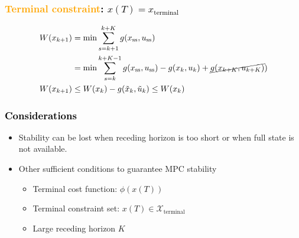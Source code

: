 \subsubsection*{\textcolor{orange}{Terminal constraint}\textcolor{black}{: $x(T) = x_{\text{terminal}}$}}
\begin{minipage}{0.58\textwidth}
    \begin{align*}
        W(x_{k+1}) &= \min \sum_{s=k+1}^{k+K} g(x_\mathrm{ss}, u_\mathrm{ss}) \\
        &= \min \sum_{s=k}^{k+K-1} g(x_\mathrm{ss}, u_\mathrm{ss}) - g(x_k, u_k) + \cancel{g(x_{k+K}, u_{k+K})})\\
        W(x_{k+1}) &\leq W(x_k) - g(\tilde{x}_k, \tilde{u}_k) \leq W(x_k)
    \end{align*}

    \subsubsection*{\textcolor{black}{Considerations}}
    \begin{itemize}
        \item Stability can be lost when receding horizon is too short or when full state is not available.
        \item Other sufficient conditions to guarantee MPC stability
            \begin{itemize}
                \item Terminal cost function: $\phi(x(T))$
                \item Terminal constraint set: $x(T) \in \mathcal{X}_\text{terminal}$
                \item Large receding horizon $K$
            \end{itemize}
    \end{itemize}
\end{minipage}
